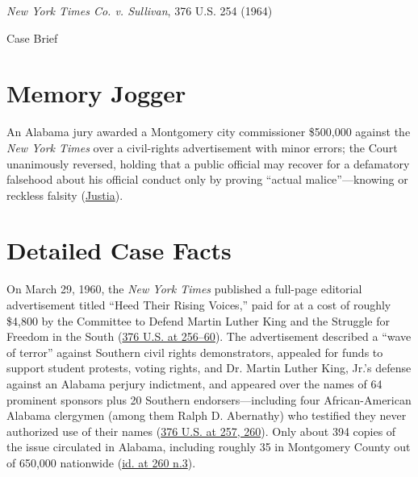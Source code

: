 \documentclass[12pt]{article}
\begin{document}
\begin{center}
{\LARGE \textit{New York Times Co. v. Sullivan}, 376 U.S. 254 (1964)\par}
\vspace{0.8em}
{\large Case Brief\par}
\end{center}
\vspace{1em}

\section{Memory Jogger}
An Alabama jury awarded a Montgomery city commissioner \$500,000 against the \textit{New York Times} over a civil-rights advertisement with minor errors; the Court unanimously reversed, holding that a public official may recover for a defamatory falsehood about his official conduct only by proving ``actual malice''---knowing or reckless falsity (\href{https://supreme.justia.com/cases/federal/us/376/254/}{Justia}).

\section{Detailed Case Facts}
On March 29, 1960, the \textit{New York Times} published a full-page editorial advertisement titled ``Heed Their Rising Voices,'' paid for at a cost of roughly \$4,800 by the Committee to Defend Martin Luther King and the Struggle for Freedom in the South (\href{https://supreme.justia.com/cases/federal/us/376/254/}{376 U.S. at 256--60}). The advertisement described a ``wave of terror'' against Southern civil rights demonstrators, appealed for funds to support student protests, voting rights, and Dr. Martin Luther King, Jr.'s defense against an Alabama perjury indictment, and appeared over the names of 64 prominent sponsors plus 20 Southern endorsers---including four African-American Alabama clergymen (among them Ralph D. Abernathy) who testified they never authorized use of their names (\href{https://www.law.cornell.edu/supremecourt/text/376/254}{376 U.S. at 257, 260}). Only about 394 copies of the issue circulated in Alabama, including roughly 35 in Montgomery County out of 650,000 nationwide (\href{https://supreme.justia.com/cases/federal/us/376/254/}{id. at 260 n.3}).
\end{document}
